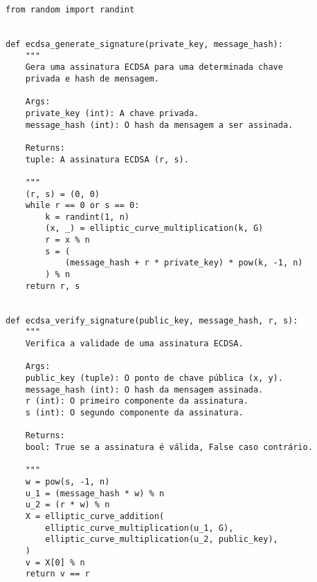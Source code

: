  \label{anexo:cb388af7-af2f-47f9-b21f-1d0d0a95c9e9}
\begin{verbatim}
from random import randint


def ecdsa_generate_signature(private_key, message_hash):
    """
    Gera uma assinatura ECDSA para uma determinada chave
    privada e hash de mensagem.

    Args:
    private_key (int): A chave privada.
    message_hash (int): O hash da mensagem a ser assinada.

    Returns:
    tuple: A assinatura ECDSA (r, s).

    """
    (r, s) = (0, 0)
    while r == 0 or s == 0:
        k = randint(1, n)
        (x, _) = elliptic_curve_multiplication(k, G)
        r = x % n
        s = (
            (message_hash + r * private_key) * pow(k, -1, n)
        ) % n
    return r, s


def ecdsa_verify_signature(public_key, message_hash, r, s):
    """
    Verifica a validade de uma assinatura ECDSA.

    Args:
    public_key (tuple): O ponto de chave pública (x, y).
    message_hash (int): O hash da mensagem assinada.
    r (int): O primeiro componente da assinatura.
    s (int): O segundo componente da assinatura.

    Returns:
    bool: True se a assinatura é válida, False caso contrário.

    """
    w = pow(s, -1, n)
    u_1 = (message_hash * w) % n
    u_2 = (r * w) % n
    X = elliptic_curve_addition(
        elliptic_curve_multiplication(u_1, G),
        elliptic_curve_multiplication(u_2, public_key),
    )
    v = X[0] % n
    return v == r    
\end{verbatim}

